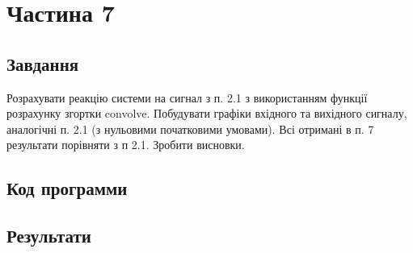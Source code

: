 \section{Частина 7}
\label{sec:task7}

\subsection{Завдання}
\label{subsec:task7_task}

Розрахувати реакцію системи на сигнал з п. 2.1 з використанням
функції розрахунку згортки convolve. Побудувати графіки вхідного та
вихідного сигналу, аналогічні п. 2.1 (з нульовими початковими умовами).
Всі отримані в п. 7 результати порівняти з п 2.1. Зробити висновки.

\subsection{Код программи}
\label{subsec:task7_code}

\subsection{Результати}
\label{subsec:task7_results}
